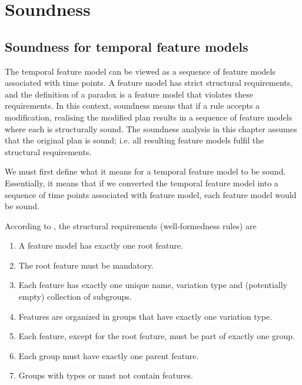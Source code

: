 \chapter{Soundness}
\label{cha:soundness}


\section{Soundness for temporal feature models}
\label{sec:soundness-for-temporal-feature-models}

The temporal feature model can be viewed as a sequence of feature models associated with time points. A feature model has strict structural requirements, and the definition of a paradox is a feature model that violates these requirements. In this context, soundness means that if a rule accepts a modification, realising the modified plan results in a sequence of feature models where each is structurally sound. The soundness analysis in this chapter assumes that the original plan is sound; i.e. all resulting feature models fulfil the structural requirements. 

We must first define what it means for a temporal feature model to be sound. Essentially, it means that if we converted the temporal feature model into a sequence of time points associated with feature model, each feature model would be sound.

According to \cite{art:consistency-preserving-evolution-planning}, the structural requirements (well-formedness rules) are 
\begin{enumerate}[\itbf{WF\arabic*}, itemsep=0mm]
   \item A feature model has exactly one root feature.
   \item The root feature must be mandatory.
   \item Each feature has exactly one unique name, variation type and (potentially empty) collection of subgroups.
   \item Features are organized in groups that have exactly one variation type.
   \item Each feature, except for the root feature, must be part of exactly one group.
   \item Each group must have exactly one parent feature.
   \item Groups with types \xortype{} or \ortype{} must not contain \mandatory{} features.
\end{enumerate}

